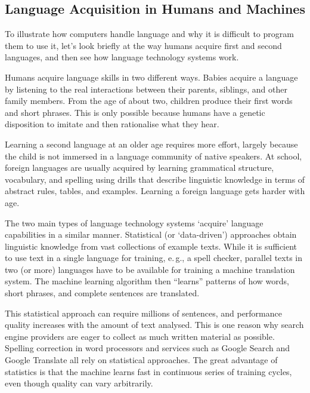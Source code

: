 \begin{multicols}{2}

\subsection{Language Acquisition in Humans and Machines}

To illustrate how computers handle language and why it is difficult to program them to use it, let's look briefly at the way humans acquire first and second languages, and then see how language technology systems work.


Humans acquire language skills in two different ways.  Babies acquire a language by listening to the real interactions between their parents, siblings, and other family members.  From the age of about two, children produce their first words and short phrases.  This is only possible because humans have a genetic disposition to imitate and then rationalise what they hear.

Learning a second language at an older age requires more effort, largely because the child is not immersed in a language community of native speakers.
At school, foreign languages are usually acquired by learning grammatical structure, vocabulary, and spelling using drills that describe linguistic knowledge in terms of abstract rules, tables, and examples.
Learning a foreign language gets harder with age.


The two main types of language technology systems `acquire' language capabilities in a similar manner.  Statistical (or `data-driven') approaches obtain linguistic knowledge from vast collections of example texts.  While it is sufficient to use text in a single language for training, e.\,g., a spell checker, parallel texts in two (or more) languages have to be available for training a machine translation system.  The machine learning algorithm then ``learns'' patterns of how words, short phrases, and complete sentences are translated.

This statistical approach can require millions of sentences, and performance quality increases with the amount of text analysed.  This is one reason why search engine providers are eager to collect as much written material as possible.  Spelling correction in word processors and services such as Google Search and Google Translate all rely on statistical approaches.  The great advantage of statistics is that the machine learns fast in continuous series of training cycles, even though quality can vary arbitrarily.


\end{multicols}
